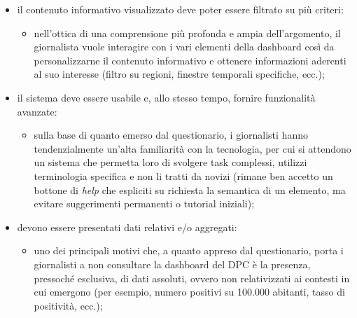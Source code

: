 \begin{itemize}
\begin{itemize}
    \end{itemize}
	\item il contenuto informativo visualizzato deve poter essere filtrato su più criteri:
	\begin{itemize}
        \item nell'ottica di una comprensione più profonda e ampia dell'argomento, il giornalista vuole interagire con i vari elementi della dashboard così da personalizzarne il contenuto informativo e ottenere informazioni aderenti al suo interesse (filtro su regioni, finestre temporali specifiche, ecc.);
    \end{itemize}
	\item il sistema deve essere usabile e, allo stesso tempo, fornire funzionalità avanzate:
	\begin{itemize}
        \item sulla base di quanto emerso dal questionario, i giornalisti hanno tendenzialmente un'alta familiarità con la tecnologia, per cui si attendono un sistema che permetta loro di svolgere task complessi, utilizzi terminologia specifica e non li tratti da novizi (rimane ben accetto un bottone di \textit{help} che espliciti su richiesta la semantica di un elemento, ma evitare suggerimenti permanenti o tutorial iniziali);
    \end{itemize}
	\item devono essere presentati dati relativi e/o aggregati:
	\begin{itemize}
        \item uno dei principali motivi che, a quanto appreso dal questionario, porta i giornalisti a non consultare la dashboard del DPC è la presenza, pressoché esclusiva, di dati assoluti, ovvero non relativizzati ai contesti in cui emergono (per esempio, numero positivi su 100.000 abitanti, tasso di positività, ecc.);
    \end{itemize}
\end{itemize}
